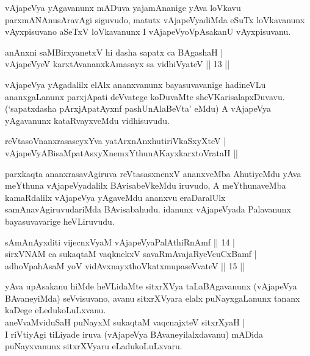 \begin{artha}
vAjapeVya yAgavanunx mADuva yajamAnanige yAva loVkavu 
parxmANAnusAravAgi siguvudo, matutx vAjapeVyadiMda eSuTx loVkavanunx 
vAyxpisuvano aSeTxV loVkavanunx I vAjapeVyoVpAsakanU vAyxpisuvanu.
\end{artha}


\begin{shl}
anAnxni saMBirxyanetxV hi dasha sapatx ca BAgashaH | \\
vAjapeVyeV karxtAvananxkAmasayx sa vidhiVyateV \hfill|| 13 || 
\end{shl}

\begin{artha}
vAjapeVya yAgadalilx elAlx ananxvanunx bayasuvavanige hadineVLu 
ananx\-gaLanunx parxjApati deVvatege koDuvaMte sheVKarisalapxDuvavu. 
(`sapatxdasha pArxjApatAyxnf pashU\-nAlaBeVta' eMdu) A vAjapeVya 
yAgavanunx kataRvayxveMdu vidhisuvudu.
\end{artha}

\begin{shl}
reVtasoV\s nanxrasaseyxYva yatArxnAnxhutiriVkaSxyXteV | \\
vAjapeVyABisaMpatAsxyXnemxYthunAKayxkarxtoVrataH || 
\end{shl}

\begin{artha}
parxkaqta ananxrasavAgiruva reVtasasxnenxV ananxveMba AhutiyeMdu yAva \-meYthuna vAjapeVyadalilx BAvisabeVkeMdu iruvudo, A meYthunaveMba kamaRdalilx vAja\-peVya yAgaveMdu ananxvu eraDaralUlx samAnavAgiruvudariMda BAvisa\-bahudu. idanunx vAjapeVyada Palavanunx bayasuvavarige heVLiruvudu.
\end{artha}


\begin{shl}
sAmAnAyxditi vijecnxVyaM vAjapeVyaPalAthiRnAmf \hfill|| 14 | \\
sirxVNAM ca sukaqtaM vaqknekxV savaRmAvajaRyeVcuCxBamf | \\
adhoVpahAsaM yoV vidAvxnayxthoVkatxmupaseVvateV \hfill|| 15 || 
\end{shl}

\begin{artha}
yAva upAsakanu hiMde heVLidaMte sitxrXVya taLaBAgavanunx (vAjapeVya 
BAvaneyiMda) seVvisuvano, avanu sitxrXVyara elalx puNayxgaLanunx 
tananx kaDege eLedukoLuLxvanu. \\ aneVvaMviduSaH puNayxM sukaqtaM vaqcnajxteV sitxrXyaH | \\ I riVtiyAgi tiLiyade iruva 
(vAjapeVya BAvaneyilalxdavanu) mADida puNayxvanunx sitxrXVyaru eLadukoLuLxvaru.
\end{artha}

